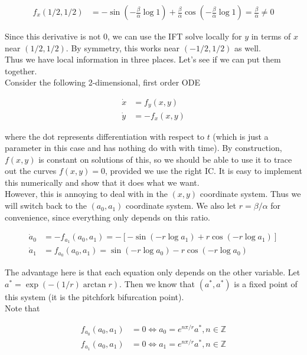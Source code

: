 \documentclass[12pt]{article}
\def\Z{{\mathbb Z}}
\begin{document}
\begin{enumerate}
\begin{align*}
f_x(1/2, 1/2) &= -\sin \left( - \frac{\beta}{\alpha} \log 1 \right) + \frac{\beta}{\alpha} \cos \left( - \frac{\beta}{\alpha} \log 1 \right)= \frac{\beta}{\alpha} \neq 0
\end{align*}

Since this derivative is not 0, we can use the IFT solve locally for $y$ in terms of $x$ near $(1/2, 1/2)$. By symmetry, this works near $(-1/2, 1/2)$ as well. \\

Thus we have local information in three places. Let's see if we can put them together.\\

Consider the following 2-dimensional, first order ODE

\begin{align*}
\dot x &= f_y(x,y)\\
\dot y &= -f_x(x,y)
\end{align*}

where the dot represents differentiation with respect to $t$ (which is just a parameter in this case and has nothing do with with time). By construction, $f(x,y)$ is constant on solutions of this, so we should be able to use it to trace out the curves $f(x,y) = 0$, provided we use the right IC. It is easy to implement this numerically and show that it does what we want. \\

However, this is annoying to deal with in the $(x,y)$ coordinate system. Thus we will switch back to the $(a_0, a_1)$ coordinate system. We also let $r = \beta/ \alpha$ for convenience, since everything only depends on this ratio.

\begin{align}
\dot a_0 &= -f_{a_1}(a_0, a_1) = -[ -\sin(-r \log a_1) 
+ r \cos( -r \log a_1 ) ] \\
\dot a_1 &= f_{a_0}(a_0, a_1) = \sin(-r \log a_0) 
- r \cos( -r \log a_0 )
\end{align}

The advantage here is that each equation only depends on the other variable. Let $a^* = \exp \left( -(1/r) \arctan r \right)$. Then we know that $(a^*, a^*)$ is a fixed point of this system (it is the pitchfork bifurcation point).\\

Note that 

\begin{align*}
f_{a_0}(a_0, a_1) &= 0 \iff a_0 = e^{n \pi / r} a^*, n \in \Z \\
f_{a_1}(a_0, a_1) &= 0 \iff a_1 = e^{n \pi / r} a^*, n \in \Z
\end{align*}


\end{enumerate}
\end{document}

